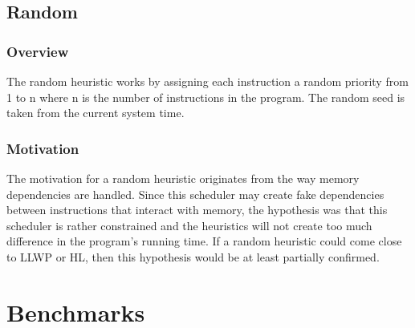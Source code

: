 \documentclass{article}
\begin{document}
\subsection{Random}
\subsubsection{Overview}
The random heuristic works by assigning each instruction a random priority from 1 to n where n is the number of instructions in the program. The random seed is taken from the current system time.
\subsubsection{Motivation}
The motivation for a random heuristic originates from the way memory dependencies are handled. Since this scheduler may create fake dependencies between instructions that interact with memory, the hypothesis was that this scheduler is rather constrained and the heuristics will not create too much difference in the program's running time. If a random heuristic could come close to LLWP or HL, then this hypothesis would be at least partially confirmed.

\section{Benchmarks}
\end{document}
